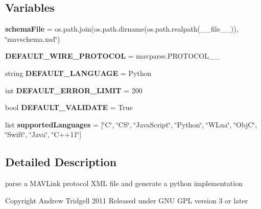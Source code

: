 \subsection*{Variables}
\begin{DoxyCompactItemize}
\item 
\mbox{\label{namespacepymavlink_1_1generator_1_1mavgen_af0e7f6ac0244a7a893599550ae69a662}} 
{\bfseries schema\+File} = os.\+path.\+join(os.\+path.\+dirname(os.\+path.\+realpath(\+\_\+\+\_\+file\+\_\+\+\_\+)), \char`\"{}mavschema.\+xsd\char`\"{})
\item 
\mbox{\label{namespacepymavlink_1_1generator_1_1mavgen_abf74e4464cc281c1350dae3930435bed}} 
{\bfseries D\+E\+F\+A\+U\+L\+T\+\_\+\+W\+I\+R\+E\+\_\+\+P\+R\+O\+T\+O\+C\+OL} = mavparse.\+P\+R\+O\+T\+O\+C\+O\+L\+\_\+\_
\item 
\mbox{\label{namespacepymavlink_1_1generator_1_1mavgen_a65f98f41c53e5f7e200dc0d29d5c145d}} 
string {\bfseries D\+E\+F\+A\+U\+L\+T\+\_\+\+L\+A\+N\+G\+U\+A\+GE} = \textquotesingle{}Python\textquotesingle{}
\item 
\mbox{\label{namespacepymavlink_1_1generator_1_1mavgen_abd60aefad7485fc1278640acaa724ee5}} 
int {\bfseries D\+E\+F\+A\+U\+L\+T\+\_\+\+E\+R\+R\+O\+R\+\_\+\+L\+I\+M\+IT} = 200
\item 
\mbox{\label{namespacepymavlink_1_1generator_1_1mavgen_aee44fcfd95ce6860ecc9b4dc638b853b}} 
bool {\bfseries D\+E\+F\+A\+U\+L\+T\+\_\+\+V\+A\+L\+I\+D\+A\+TE} = True
\item 
\mbox{\label{namespacepymavlink_1_1generator_1_1mavgen_aab04d5e3d392e7ed72368d0ee440437a}} 
list {\bfseries supported\+Languages} = \mbox{[}\char`\"{}C\char`\"{}, \char`\"{}CS\char`\"{}, \char`\"{}Java\+Script\char`\"{}, \char`\"{}Python\char`\"{}, \char`\"{}W\+Lua\char`\"{}, \char`\"{}ObjC\char`\"{}, \char`\"{}Swift\char`\"{}, \char`\"{}Java\char`\"{}, \char`\"{}C++11\char`\"{}\mbox{]}
\end{DoxyCompactItemize}


\subsection{Detailed Description}
\begin{DoxyVerb}parse a MAVLink protocol XML file and generate a python implementation

Copyright Andrew Tridgell 2011
Released under GNU GPL version 3 or later\end{DoxyVerb}
 

